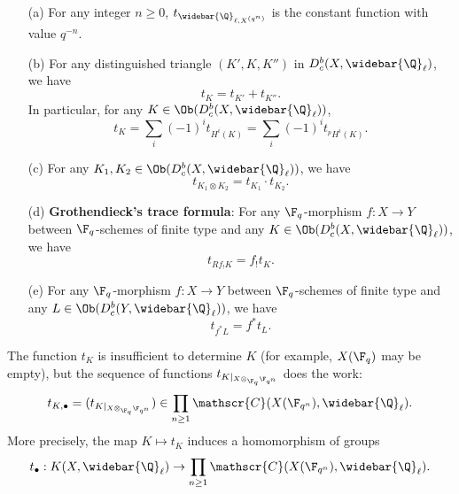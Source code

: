 \begin{enumerate}
    \item[(a)] For any integer $n\geq 0$, $t_{\widebar{\Q}_{\ell,X^{(q^n)}}}$ is the constant function with value $q^{-n}$.
    \item[(b)] For any distinguished triangle $(K',K,K'')$ in $D^b_c(X,\widebar{\Q}_\ell)$, we have 
    \begin{equation}\label{scheme Frobenius trace function prop-1}
    t_K=t_{K'}+t_{K''}.
    \end{equation}
    In particular, for any $K\in\Ob(D^b_c(X,\widebar{\Q}_\ell))$, 
    \begin{equation}\label{scheme Frobenius trace function prop-2}
    t_K=\sum_i(-1)^it_{H^i(K)}=\sum_i(-1)^it_{{^p\!H^i(K)}}.
    \end{equation}
    \item[(c)] For any $K_1,K_2\in\Ob(D^b_c(X,\widebar{\Q}_\ell))$, we have
    \begin{equation}\label{scheme Frobenius trace function prop-3}
    t_{K_1\otimes K_2}=t_{K_1}\cdot t_{K_2}.
    \end{equation}
    \item[(d)] \textbf{Grothendieck's trace formula}: For any $\F_q$-morphism $f:X\to Y$ between $\F_q$-schemes of finite type and any $K\in\Ob(D^b_c(X,\widebar{\Q}_\ell))$, we have
    \begin{equation}\label{scheme Frobenius trace function prop-4}
    t_{Rf_!K}=f_!t_K.
    \end{equation}
    \item[(e)] For any $\F_q$-morphism $f:X\to Y$ between $\F_q$-schemes of finite type and any $L\in\Ob(D^b_c(Y,\widebar{\Q}_\ell))$, we have
    \begin{equation}\label{scheme Frobenius trace function prop-5}
    t_{f^*L}=f^*t_L.
    \end{equation}
\end{enumerate}

The function $t_K$ is insufficient to determine $K$ (for example, $X(\F_q)$ may be empty), but the sequence of functions $t_{K|_{X\otimes_{\F_q}\F_{q^n}}}$ does the work:
\[t_{K,\bullet}=(t_{K|_{X\otimes_{\F_q}\F_{q^n}}})\in\prod_{n\geq 1}\mathscr{C}(X(\F_{q^n}),\widebar{\Q}_\ell).\]
More precisely, the map $K\mapsto t_K$ induces a homomorphism of groups
\[t_\bullet:K(X,\widebar{\Q}_\ell)\to\prod_{n\geq 1}\mathscr{C}(X(\F_{q^n}),\widebar{\Q}_\ell).\]

